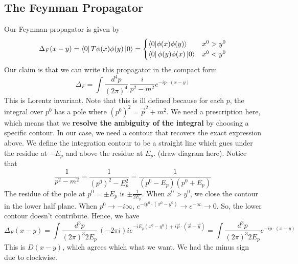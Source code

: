 \subsection{The Feynman Propagator} 
Our Feynman propagator is given by 
\[
\Delta_F( x - y )  = \bra{0}T \phi ( x) \phi( y ) \ket{0}  = \begin{cases}
\braket{0}{\phi ( x) \phi( y )} & x^{ 0 } > y^ 0 \\
\bra{0}\phi(y)\phi(x)\ket{0} & x^ 0 < y^0  
\end{cases}
\] Our claim is that we can write this propagator in the compact form 
\[
\Delta_F = \int \frac{d^4 p }{( 2 \pi )^4 } \, \frac{i }{p^2  - m^2 }e^{  - i p \cdot  ( x - y ) }
\] This is Lorentz invariant. Note that this is ill defined 
because for each $p $, the integral over $p^0 $ has 
a pole where $ ( p^0 )^2 = \vec{p}^2 + m^2 $. We need a prescription here, which means that we \textbf{resolve the ambiguity of the integral} by choosing a specific contour. 
In our case, we need a contour that recovers the exact expression above. 
We define the integration contour to be a straight line which gues under the residue at $ - E_p$ and above the residue at $ E_ p $.  
(draw diagram here). Notice that 
\[
\frac{1}{ p^2  - m^2 } = \frac{1}{ ( p^0)^ 2 - E_p^2}  = \frac{1}{( p^0 - E_p )(p^0 + E_p ) }
\] The residue of the pole at $ p^0 = \pm E_p $ is $ \pm \frac{1}{2 E_p}$. 
When $ x^ 0 > y ^0 $, we close the contour in the 
lower half plane. When $ p^0 \to  - i \infty $, $e^{  -i p^0 \cdot ( x^ 0 - y ^ 0 )} \to e^{  - \infty} \to 0 $. So, the lower contour doesn't 
contribute.  Hence, we have
\[
\Delta_F ( x - y )  = \int \frac{d^ 3 p }{ ( 2 \pi )^3 2 E_p } \, ( -  2  \pi i ) i e^{ - i E_p ( x^ 0 - y ^0 ) + i \vec{p} \cdot  ( \vec{x} - \vec{y} ) } = \int \frac{d^3 p }{ ( 2 \pi )^3 2 E_p } e^{  - i p \cdot  ( x -y ) }
\] This is $ D( x -y ) $, which agrees which what we want. We had the minus sign due to clockwise. 

